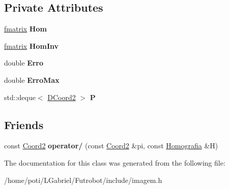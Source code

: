 \subsection*{Private Attributes}
\begin{DoxyCompactItemize}
\item 
\hyperlink{classfmatrix}{fmatrix} {\bfseries Hom}\hypertarget{classHomografia_ae8bc40370923ecb0f84e7864819c7097}{}\label{classHomografia_ae8bc40370923ecb0f84e7864819c7097}

\item 
\hyperlink{classfmatrix}{fmatrix} {\bfseries Hom\+Inv}\hypertarget{classHomografia_a356810106da9f8de4126b04cc383b532}{}\label{classHomografia_a356810106da9f8de4126b04cc383b532}

\item 
double {\bfseries Erro}\hypertarget{classHomografia_a2e6bb49f3480fc5632b349e9e13111e6}{}\label{classHomografia_a2e6bb49f3480fc5632b349e9e13111e6}

\item 
double {\bfseries Erro\+Max}\hypertarget{classHomografia_a966090fca3eb32be9033030d87084344}{}\label{classHomografia_a966090fca3eb32be9033030d87084344}

\item 
std\+::deque$<$ \hyperlink{structDCoord2}{D\+Coord2} $>$ {\bfseries P}\hypertarget{classHomografia_a6a0a07f1d19ed3c463897f4f7d9cb36e}{}\label{classHomografia_a6a0a07f1d19ed3c463897f4f7d9cb36e}

\end{DoxyCompactItemize}
\subsection*{Friends}
\begin{DoxyCompactItemize}
\item 
const \hyperlink{structCoord2}{Coord2} {\bfseries operator/} (const \hyperlink{structCoord2}{Coord2} \&pi, const \hyperlink{classHomografia}{Homografia} \&H)\hypertarget{classHomografia_ab1f0b063805f0470ffdc7b878e23827f}{}\label{classHomografia_ab1f0b063805f0470ffdc7b878e23827f}

\end{DoxyCompactItemize}


The documentation for this class was generated from the following file\+:\begin{DoxyCompactItemize}
\item 
/home/poti/\+L\+Gabriel/\+Futrobot/include/imagem.\+h\end{DoxyCompactItemize}
